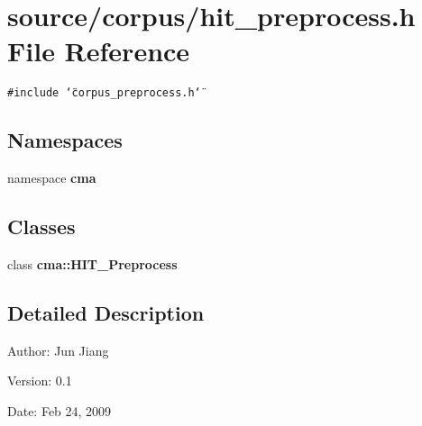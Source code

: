 \section{source/corpus/hit\_\-preprocess.h File Reference}
\label{hit__preprocess_8h}
{\tt \#include \char`\"{}corpus\_\-preprocess.h\char`\"{}}\par
\subsection*{Namespaces}
\begin{CompactItemize}
\item 
namespace \textbf{cma}
\end{CompactItemize}
\subsection*{Classes}
\begin{CompactItemize}
\item 
class {\bf cma::HIT\_\-Preprocess}
\end{CompactItemize}


\subsection{Detailed Description}
\begin{Desc}
\item[Author:]Jun Jiang \end{Desc}
\begin{Desc}
\item[Version:]0.1 \end{Desc}
\begin{Desc}
\item[Date:]Feb 24, 2009 \end{Desc}
